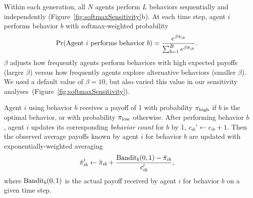 \documentclass[letterpaper,11.5pt]{scrartcl}
\begin{document}
Within each generation, all $N$ agents perform $L$ behaviors sequentially and
independently (Figure~\ref{fig:softmaxSensitivity}b).
At each time step, agent $i$ performs behavior $b$ with softmax-weighted probability
\begin{equation}
  \Pr(\text{Agent $i$ performs behavior $b$}) = 
    \frac{e^{\beta \bar\pi_{ib}}}{\sum_{b=1}^B e^{\beta \bar\pi_{ib}}}.
\end{equation}
\noindent
$\beta$ adjusts how frequently agents perform 
behaviors with high expected payoffs (larger $\beta$) versus how frequently
agents explore alternative behaviors (smaller $\beta$). %
We used a default value of $\beta = 10$, but also varied this value in our
sensitivity analyses~(Figure~\ref{fig:softmaxSensitivity}). 

Agent $i$ using behavior $b$ receives a payoff of 1 with probability $\pi_{\mathrm{high}}$
if $b$ is the optimal behavior, or with probability $\pi_{\mathrm{low}}$ otherwise. 
After performing behavior $b$, agent $i$ updates its
corresponding \emph{behavior count} for $b$ by 1, $c_{ib}' \leftarrow c_{ib} + 1$.
Then the observed average payoffs known by agent $i$ for behavior $b$ are updated with
exponentially-weighted averaging
\begin{equation}
  \bar\pi_{ib}' \leftarrow \bar\pi_{ib} + \frac{\text{Bandit}_b(0, 1) - \bar\pi_{ib}}{c_{ib}'},
\end{equation}
\noindent
where $\text{Bandit}_b(0, 1)$ is the actual payoff received by agent $i$ for behavior $b$ on a
given %
time step. 
\end{document}
